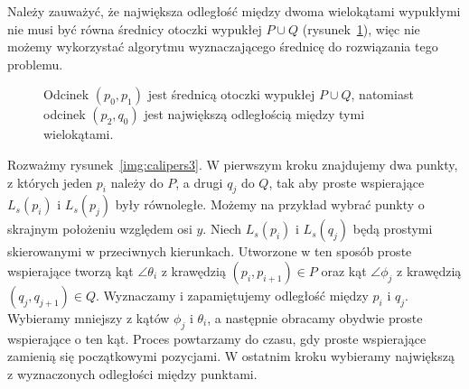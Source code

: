Należy zauważyć, że największa odległość między dwoma wielokątami
wypukłymi nie musi być równa średnicy otoczki wypukłej $P \cup Q$
(rysunek~\ref{fig:maxdist}), więc nie możemy wykorzystać algorytmu
wyznaczającego średnicę do rozwiązania tego problemu.

\begin{figure}[tb]
  \centering
  \caption{\label{fig:maxdist} Odcinek $(p_0, p_1)$ jest średnicą otoczki
    wypukłej $P \cup Q$, natomiast odcinek $(p_2, q_0)$ jest największą
    odległością między tymi wielokątami.}
\end{figure}

Rozważmy rysunek~\ref{img:calipers3}. W pierwszym kroku znajdujemy dwa
punkty, z których jeden $p_i$ należy do $P$, a drugi $q_j$ do $Q$, tak
aby proste wspierające $L_s(p_i)$ i $L_s(p_j)$ były równoległe. Możemy
na przykład wybrać punkty o skrajnym położeniu względem osi $y$. Niech
$L_s(p_i)$ i $L_s(q_j)$ będą prostymi skierowanymi w przeciwnych
kierunkach. Utworzone w ten sposób proste wspierające tworzą kąt
$\angle{\theta_i}$ z krawędzią $(p_i, p_{i+1}) \in P$ oraz kąt
$\angle{\phi_j}$ z krawędzią $(q_j, q_{j+1}) \in Q$. Wyznaczamy i
zapamiętujemy odległość między $p_i$ i $q_j$. Wybieramy mniejszy z
kątów $\phi_j$ i $\theta_i$, a następnie obracamy obydwie proste
wspierające o ten kąt. Proces powtarzamy do czasu, gdy proste
wspierające zamienią się początkowymi pozycjami. W ostatnim kroku
wybieramy największą z wyznaczonych odległości między punktami.

